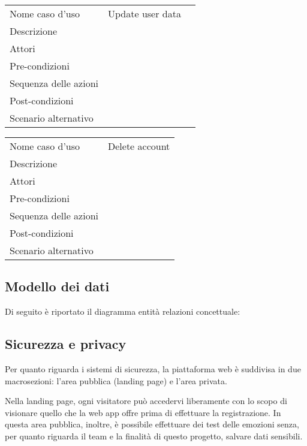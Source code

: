 \begin{table}[H]
	\centering
	\caption{Use Case: Update user data}
	\label{tab:use-case-user-data-update}
	\begin{longtable}{@{}|>{\centering\arraybackslash}m{}|m{}|>{\centering\arraybackslash}m{}|@{}}
		Nome caso d'uso & Update user data \\
		Descrizione & \\
		Attori & \\
		Pre-condizioni & \\
		Sequenza delle azioni & \\
		Post-condizioni & \\
		Scenario alternativo & \\

	\end{longtable}
\end{table}

\begin{table}[H]
	\centering
	\caption{Use Case: Delete account}
	\label{tab:use-case-delete-account}
	\rowcolors{2}{gray!25}{white!0}
	\begin{longtable}{@{}|>{\centering\arraybackslash}m{}|m{}}
		Nome caso d'uso & Delete account \\
		Descrizione & \\
		Attori & \\
		Pre-condizioni & \\
		Sequenza delle azioni & \\
		Post-condizioni & \\
		Scenario alternativo & 
	\end{longtable}
\end{table}
\newpage
\subsection{Modello dei dati}
Di seguito è riportato il diagramma entità relazioni concettuale:


\subsection{Sicurezza e privacy}
Per quanto riguarda i sistemi di sicurezza, la piattaforma web è suddivisa in 
due macrosezioni: l'area pubblica (landing page) e l'area privata.

Nella landing page, ogni visitatore può accedervi liberamente con lo scopo di 
visionare quello che la web app offre prima di effettuare la registrazione. In 
questa area pubblica, inoltre, è possibile effettuare dei test delle emozioni 
senza, per quanto riguarda il team e la finalità di questo progetto, salvare 
dati sensibili.

